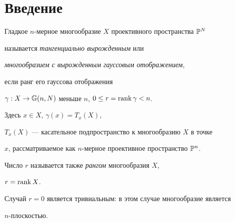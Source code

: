 \label{begin}





















\setcounter{equation}{0}





\setcounter{section}{-1}





\section{Введение}





Гладкое $n$-мерное многообразие $X$ проективного пространства ${\Bbb P}^N$


называется {\em тангенциально вырожденным} или


{\em многообразием с вырожденным гауссовым отображением},


если ранг его гауссова отображения


$\gamma: X \rightarrow {\Bbb G} (n, N)$ меньше $n$, $0 \leq r = \rank


\gamma < n$.


Здесь $x \in X$, $\gamma (x) = T_x (X)$,


$T_x (X)$ --- касательное подпространство к многообразию $X$ в точке


$x$, рассматриваемое как $n$-мерное проективное пространство ${\Bbb P}^n$.


Число  $r$ называется также {\em рангом} многообразия $X$,


$r=\operatorname{rank} X$.


Случай $r = 0 $ является  тривиальным: в этом случае многообразие является


$n$-плоскостью.





